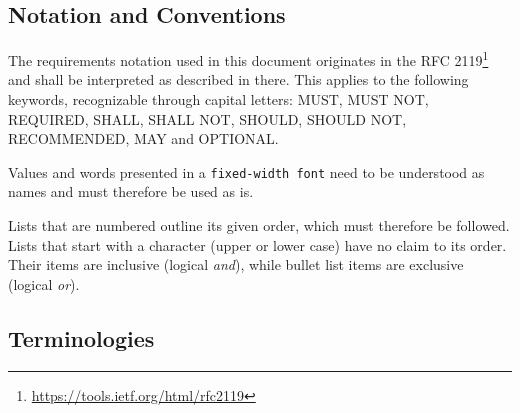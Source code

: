 \documentclass[12pt,english,a4paper,titlepage,cleardoublepage=empty,dottedtoc]{report}
\renewcommand{\href}[2]{#2\footnote{\url{#1}}}
\begin{document}
\subsection*{Notation and Conventions}\label{notation-and-conventions}

The requirements notation used in this document originates in the
\href{https://tools.ietf.org/html/rfc2119}{RFC 2119} and shall be
interpreted as described in there. This applies to the following
keywords, recognizable through capital letters: MUST, MUST NOT,
REQUIRED, SHALL, SHALL NOT, SHOULD, SHOULD NOT, RECOMMENDED, MAY and
OPTIONAL.

Values and words presented in a \texttt{fixed-width\ font} need to be
understood as names and must therefore be used as is.

Lists that are numbered outline its given order, which must therefore be
followed. Lists that start with a character (upper or lower case) have
no claim to its order. Their items are inclusive (logical \emph{and}),
while bullet list items are exclusive (logical \emph{or}).

\subsection*{Terminologies}\label{terminologies-1}
\end{document}
